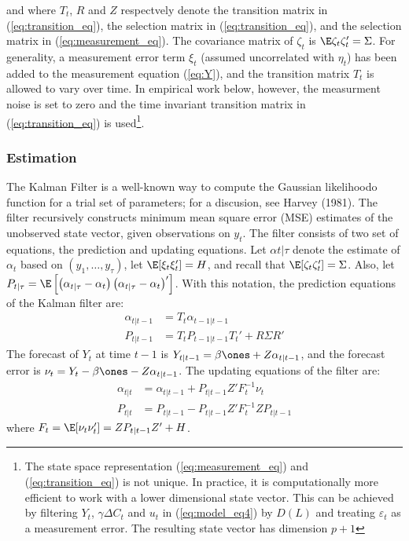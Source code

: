 and where $T_t$, $R$ and $Z$ respectvely denote the transition matrix in (\ref{eq:transition_eq}), the selection matrix in (\ref{eq:transition_eq}), and the selection matrix in (\ref{eq:measurement_eq}). The covariance matrix of $\zeta_t$ is $\E\zeta_t\zeta_t'=\Sigma$. For generality, a measurement error term $\xi_t$ (assumed uncorrelated with $\eta_t$) has been added to the measurement equation (\ref{eq:Y}), and the transition matrix $T_t$ is allowed to vary over time. In empirical work below, however, the measurment noise is set to zero and the time invariant transition matrix in (\ref{eq:transition_eq}) is used\footnote{The state space representation (\ref{eq:measurement_eq}) and (\ref{eq:transition_eq}) is not unique. In practice, it is computationally more efficient to work with a lower dimensional state vector. This can be achieved by filtering $Y_t$, $\gamma\Delta C_t$ and $u_t$ in (\ref{eq:model_eq4}) by $D(L)$ and treating $\varepsilon_t$ as a measurement error. The resulting state vector has dimension $p+1$}.

\subsubsection{Estimation}

The Kalman Filter is a well-known way to compute the Gaussian likelihoodo function for a trial set of parameters; for a discusion, see Harvey (1981). The filter recursively constructs minimum mean square error (MSE) estimates of the unobserved state vector, given observations on $y_t$. The filter consists of two set of equations, the prediction and updating equations. Let $\alpha{t|\tau}$ denote the estimate of $\alpha_t$ based on $(y_1,\ldots, y_\tau)$, let $\E[\xi_t\xi_t'] = H$, and recall that $\E[\zeta_t\zeta_t'] = \Sigma$. Also, let $P_{t|\tau} = \E\left[\left(\alpha_{t|\tau}-\alpha_t\right)\left(\alpha_{t|\tau}-\alpha_t\right)'\right]$. With this notation, the prediction equations of the Kalman filter are:
\begin{align}
	\alpha_{t|t-1} &= T_t \alpha_{t-1|t-1}\label{eq:KF_eq12}\\
	P_{t|t-1} &= T_t P_{t-1|t-1}T_t' + R\Sigma R'\label{eq:KF_eq13}
\end{align}
The forecast of $Y_t$ at time $t-1$ is $Y_{t|t-1} = \beta\ones + Z\alpha_{t|t-1}$, and the forecast error is $\nu_t=Y_t-\beta\ones - Z\alpha_{t|t-1}$. The updating equations of the filter are:
\begin{align}
	\alpha_{t|t} &= \alpha_{t|t-1} + P_{t|t-1} Z'F_t^{-1}\nu_t\label{eq:KF_eq14}\\
	P_{t|t}& = P_{t|t-1} - P_{t|t-1}Z'F_t^{-1} Z P_{t|t-1}\label{eq:KF_eq15}
\end{align}
where $F_t = \E[\nu_t\nu_t'] = Z P_{t|t-1}Z' + H$. 

